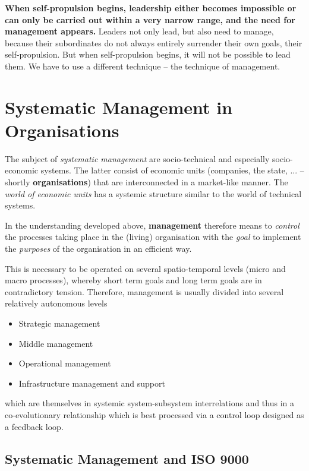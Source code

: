 \documentclass[11pt,a4paper]{article}
\begin{document}
\textbf{When self-propulsion begins, leadership either becomes impossible or
  can only be carried out within a very narrow range, and the need for
  management appears.} Leaders not only lead, but also need to manage, because
their subordinates do not always entirely surrender their own goals, their
self-propulsion. But when self-propulsion begins, it will not be possible to
lead them. We have to use a different technique – the technique of management.

\section{Systematic Management in Organisations}

The subject of \emph{systematic management} are socio-technical and especially
socio-economic systems. The latter consist of economic units (companies, the
state, ... -- shortly \textbf{organisations}) that are interconnected in a
market-like manner. The \emph{world of economic units} has a systemic
structure similar to the world of technical systems.

In the understanding developed above, \textbf{management} therefore means to
\emph{control} the processes taking place in the (living) organisation with
the \emph{goal} to implement the \emph{purposes} of the organisation in an
efficient way.

This is necessary to be operated on several spatio-temporal levels (micro and
macro processes), whereby short term goals and long term goals are in 
contradictory tension. Therefore, management is usually divided into several
relatively autonomous levels
\begin{itemize}[noitemsep]
\item Strategic management
\item Middle management
\item Operational management
\item Infrastructure management and support
\end{itemize}
which are themselves in systemic system-subsystem interrelations and thus in a
co-evolutio\-nary relationship which is best processed via a control loop
designed as a feedback loop.

\subsection{Systematic Management and ISO 9000}
\end{document}
